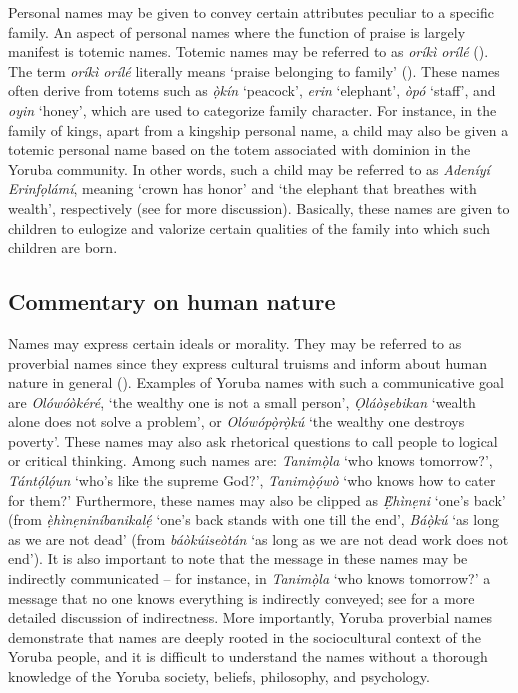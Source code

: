 \documentclass[output=paper,colorlinks,citecolor=brown]{langscibook}
\begin{document}
Personal names may be given to convey certain attributes peculiar to a specific family. An aspect of personal names where the function of praise is largely manifest is totemic names. Totemic names may be referred to as \textit{oríkì orílé} (\cite{Oduyoye1972}). The term \textit{oríkì orílé} literally means ‘praise belonging to family’ (\cite{Ehineni2019}). These names often derive from totems such as \textit{ọ̀kín} ‘peacock’, \textit{erin} ‘elephant', \textit{òpó} ‘staff’, and \textit{oyin} ‘honey’, which are used to categorize family character. For instance, in the family of kings, apart from a kingship personal name, a child may also be given a totemic personal name based on the totem associated with dominion in the Yoruba community. In other words, such a child may be referred to as \textit{Adeníyí Erinfọlámí}, meaning ‘crown has honor’ and ‘the elephant that breathes with wealth’, respectively (see \cite{Ehineni2019} for more discussion). Basically, these names are given to children to eulogize and valorize certain qualities of the family into which such children are born. 

\subsection{Commentary on human nature}

Names may express certain ideals or morality. They may be referred to as proverbial names since they express cultural truisms and inform about human nature in general (\cite{Obeng2001}). Examples of Yoruba names with such a communicative goal are \textit{Olówóòkéré}, ‘the wealthy one is not a small person’, \textit{Ọláòṣebikan} ‘wealth alone does not solve a problem’, or \textit{Olówópọ̀rọ̀kú} ‘the wealthy one destroys poverty’. These names may also ask rhetorical questions to call people to logical or critical thinking. Among such names are: \textit{Tanimọ̀la} ‘who knows tomorrow?’, \textit{Tántọ́lọ́un} ‘who’s like the supreme God?’, \textit{Tanimọ̀ọ́wò} ‘who knows how to cater for them?’ Furthermore, these names may also be clipped as \textit{Ẹ̀hìnẹni} ‘one’s back’ (from \textit{ẹ̀hìnẹniníbanikalẹ́} ‘one’s back stands with one till the end’, \textit{Báọ̀kú} ‘as long as we are not dead’ (from \textit{báòkúiseòtán} ‘as long as we are not dead work does not end'). It is also important to note that the message in these names may be indirectly communicated – for instance, in \textit{Tanimọ̀la} ‘who knows tomorrow?’ a message that no one knows everything is indirectly conveyed; see \citet[49--68]{Obeng1994, Obeng2001} for a more detailed discussion of indirectness. More importantly, Yoruba proverbial names demonstrate that names are deeply rooted in the sociocultural context of the Yoruba people, and it is difficult to understand the names without a thorough knowledge of the Yoruba society, beliefs, philosophy, and psychology.
\end{document}
